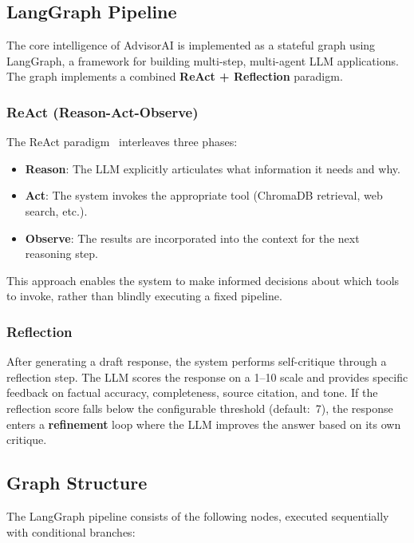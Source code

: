 \documentclass[conference,compsoc]{IEEEtran}
\begin{document}
\subsection{LangGraph Pipeline}

The core intelligence of AdvisorAI is implemented as a stateful graph using LangGraph, a framework for building multi-step, multi-agent LLM applications. The graph implements a combined \textbf{ReAct + Reflection} paradigm.

\subsubsection{ReAct (Reason-Act-Observe)}

The ReAct paradigm~\cite{yao2023react} interleaves three phases:

\begin{itemize}
    \item \textbf{Reason}: The LLM explicitly articulates what information it needs and why.
    \item \textbf{Act}: The system invokes the appropriate tool (ChromaDB retrieval, web search, etc.).
    \item \textbf{Observe}: The results are incorporated into the context for the next reasoning step.
\end{itemize}

This approach enables the system to make informed decisions about which tools to invoke, rather than blindly executing a fixed pipeline.

\subsubsection{Reflection}

After generating a draft response, the system performs self-critique through a reflection step. The LLM scores the response on a 1--10 scale and provides specific feedback on factual accuracy, completeness, source citation, and tone. If the reflection score falls below the configurable threshold (default:~7), the response enters a \textbf{refinement} loop where the LLM improves the answer based on its own critique.

\subsection{Graph Structure}

The LangGraph pipeline consists of the following nodes, executed sequentially with conditional branches:
\end{document}

